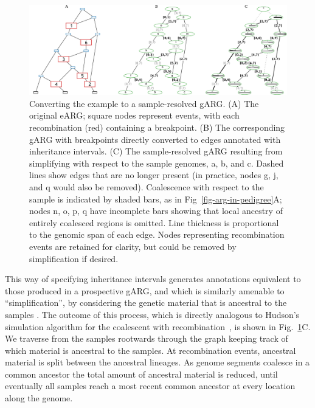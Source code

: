 \documentclass{article}
\newcommand{\noderef}[1]{\textsf{#1}}
\begin{document}
\begin{figure}
\centering
\includegraphics[width=\textwidth]{illustrations/ancestry-resolution}
\caption{\label{fig-ancestry-resolution}
Converting the \citet[][Fig.~1]{wiuf1999recombination} example
to a sample-resolved gARG. (A) The original eARG; square nodes represent events, with
each recombination (red) containing a breakpoint.
(B) The corresponding gARG with breakpoints directly converted to
edges annotated with inheritance intervals.
(C) The sample-resolved gARG resulting from simplifying with respect
to the sample genomes, \noderef{a}, \noderef{b}, and \noderef{c}.
Dashed lines show edges that are
no longer present (in practice, nodes \noderef{g}, \noderef{j}, and \noderef{q} would also be removed).
Coalescence with respect to the sample is indicated by shaded bars, as
in Fig~\ref{fig-arg-in-pedigree}A; nodes \noderef{n}, \noderef{o}, \noderef{p}, \noderef{q} have incomplete
bars showing that local ancestry of entirely coalesced regions is omitted.
Line thickness is proportional to the genomic span of each edge.
Nodes representing recombination events are retained
for clarity, but could be removed by simplification if
desired.
}
\end{figure}

This way of specifying inheritance intervals generates annotations equivalent to
those produced in a prospective gARG, and which is similarly amenable to ``simplification'',
by considering the genetic material that is ancestral to the samples \citep{kelleher2018efficient}.
The outcome of this process, which is
directly analogous to Hudson's simulation algorithm for the coalescent with
recombination~\citep{hudson1983testing,kelleher2016efficient}, is shown in
Fig.~\ref{fig-ancestry-resolution}C. We traverse from the samples rootwards through the graph
keeping track of which material is ancestral to the samples.
At recombination events, ancestral material is split between the ancestral lineages.
As genome segments coalesce in a common
ancestor the total amount of ancestral material is reduced, until
eventually all samples reach a most recent common ancestor at every location
along the genome.
\end{document}
